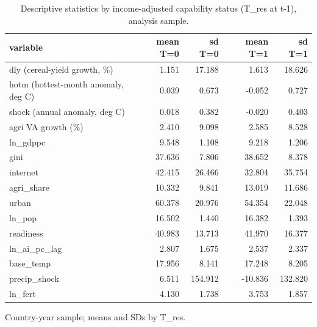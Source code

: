\begin{table}[htbp]
\centering
\caption{Descriptive statistics by income-adjusted capability status (T\_res at t-1), analysis sample.}
\label{tab:agri_desc}
\begin{tabular}{lrrrr}
\toprule
variable & mean T=0 & sd T=0 & mean T=1 & sd T=1 \\
\midrule
dly (cereal-yield growth, \%) & 1.151 & 17.188 & 1.613 & 18.626 \\
hotm (hottest-month anomaly, deg C) & 0.039 & 0.673 & -0.052 & 0.727 \\
shock (annual anomaly, deg C) & 0.018 & 0.382 & -0.020 & 0.403 \\
agri VA growth (\%) & 2.410 & 9.098 & 2.585 & 8.528 \\
ln\_gdppc & 9.548 & 1.108 & 9.218 & 1.206 \\
gini & 37.636 & 7.806 & 38.652 & 8.378 \\
internet & 42.415 & 26.466 & 32.804 & 35.754 \\
agri\_share & 10.332 & 9.841 & 13.019 & 11.686 \\
urban & 60.378 & 20.976 & 54.354 & 22.048 \\
ln\_pop & 16.502 & 1.440 & 16.382 & 1.393 \\
readiness & 40.983 & 13.713 & 41.970 & 16.377 \\
ln\_ai\_pc\_lag & 2.807 & 1.675 & 2.537 & 2.337 \\
base\_temp & 17.956 & 8.141 & 17.248 & 8.205 \\
precip\_shock & 6.511 & 154.912 & -10.836 & 132.820 \\
ln\_fert & 4.130 & 1.738 & 3.753 & 1.857 \\
\bottomrule
\end{tabular}
\par\smallskip\footnotesize Country-year sample; means and SDs by T\_res.
\end{table}
